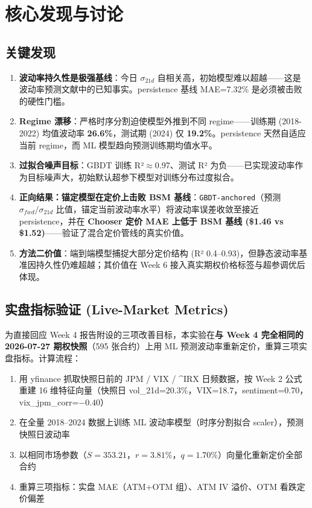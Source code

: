 \documentclass[a4paper,11pt]{article}
\begin{document}
\section{核心发现与讨论}

\subsection{关键发现}

\begin{enumerate}
    \item \textbf{波动率持久性是极强基线}：今日 $\sigma_{21d}$ 自相关高，初始模型难以超越——这是波动率预测文献中的已知事实。persistence 基线 MAE=7.32\% 是必须被击败的硬性门槛。

    \item \textbf{Regime 漂移}：严格时序分割迫使模型外推到不同 regime——训练期 (2018-2022) 均值波动率 \textbf{26.6\%}，测试期 (2024) 仅 \textbf{19.2\%}。persistence 天然自适应当前 regime，而 ML 模型趋向预测训练期均值水平。

    \item \textbf{过拟合噪声目标}：GBDT 训练 R²$\approx$0.97、测试 R² 为负——已实现波动率作为目标噪声大，初始默认超参下模型对训练分布过度拟合。

    \item \textbf{正向结果：锚定模型在定价上击败 BSM 基线}：\texttt{GBDT-anchored}（预测 $\sigma_{fwd}/\sigma_{21d}$ 比值，锚定当前波动率水平）将波动率误差收敛至接近 persistence，并在 \textbf{Chooser 定价 MAE 上低于 BSM 基线 (\$1.46 vs \$1.52)}——验证了混合定价管线的真实价值。

    \item \textbf{方法二价值}：端到端模型捕捉大部分定价结构 (R² 0.4--0.93)，但静态波动率基准因持久性仍难超越；其价值在 Week 6 接入真实期权价格标签与超参调优后体现。
\end{enumerate}

\subsection{实盘指标验证 (Live-Market Metrics)}

为直接回应 Week 4 报告附设的三项改善目标，本实验在\textbf{与 Week 4 完全相同的 2026-07-27 期权快照}（595 张合约）上用 ML 预测波动率重新定价，重算三项实盘指标。计算流程：

\begin{enumerate}
    \item 用 yfinance 抓取快照日前的 JPM / VIX / \^{}IRX 日频数据，按 Week 2 公式重建 16 维特征向量（快照日 vol\_21d=20.3\%，VIX=18.7，sentiment=0.70，vix\_jpm\_corr=$-0.40$）
    \item 在全量 2018--2024 数据上训练 ML 波动率模型（时序分割拟合 scaler），预测快照日波动率
    \item 以相同市场参数（$S=353.21$，$r=3.81\%$，$q=1.70\%$）向量化重新定价全部合约
    \item 重算三项指标：实盘 MAE（ATM+OTM 组）、ATM IV 溢价、OTM 看跌定价偏差
\end{enumerate}
\end{document}
